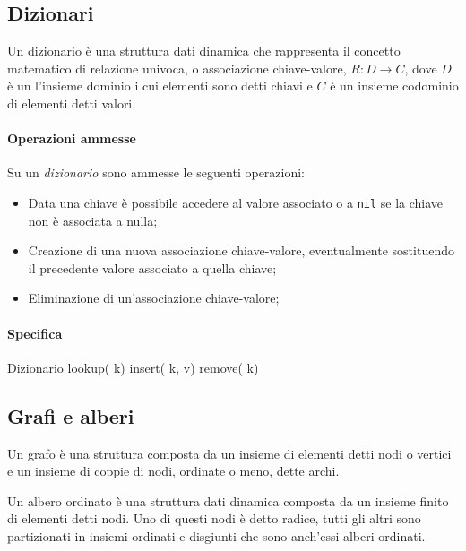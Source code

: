 \subsection{Dizionari}
\begin{definition}[Dizionario]
    Un dizionario è una struttura dati dinamica che rappresenta il concetto
    matematico di relazione univoca, o associazione chiave-valore, $R:D\to C$,
    dove $D$ è un l'insieme dominio i cui elementi sono detti chiavi e $C$ è un
    insieme codominio di elementi detti valori.
\end{definition}

\paragraph{Operazioni ammesse}
Su un \emph{dizionario} sono ammesse le seguenti operazioni:
\begin{itemize}
    \item Data una chiave è possibile accedere al valore associato o a
    \texttt{nil} se la chiave non è associata a nulla;
    \item Creazione di una nuova associazione chiave-valore, eventualmente
    sostituendo il precedente valore associato a quella chiave;
    \item Eliminazione di un'associazione chiave-valore;
\end{itemize}

\paragraph{Specifica}
\begin{code}{Dizionario}
 lookup( k)
\nl{}
insert( k,  v)
\nl{}
remove( k)
\end{code}

\subsection{Grafi e alberi}
\begin{definition}[Grafo]
    Un grafo è una struttura composta da un insieme di elementi detti nodi o
    vertici e un insieme di coppie di nodi, ordinate o meno, dette archi.
\end{definition}
\begin{definition}
    Un albero ordinato è una struttura dati dinamica composta da un insieme
    finito di elementi detti nodi. Uno di questi nodi è detto radice, tutti gli
    altri sono partizionati in insiemi ordinati e disgiunti che sono anch'essi
    alberi ordinati.
\end{definition}

